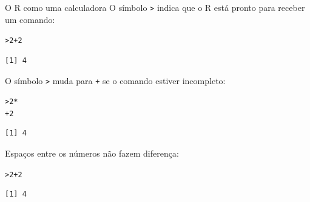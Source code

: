 \documentclass[10pt,handout]{beamer}\usepackage[]{graphicx}\usepackage[]{color}
\makeatletter
\newcommand{\hlnum}[1]{\textcolor[rgb]{0.686,0.059,0.569}{#1}}%
\newcommand{\hlopt}[1]{\textcolor[rgb]{0,0,0}{#1}}%
\newcommand{\hlstd}[1]{\textcolor[rgb]{0.345,0.345,0.345}{#1}}%
\newenvironment{kframe}{%
 \def\at@end@of@kframe{}%
 \ifinner\ifhmode%
  \def\at@end@of@kframe{\end{minipage}}%
  \begin{minipage}{\columnwidth}%
 \fi\fi%
 \def\FrameCommand##1{\hskip\@totalleftmargin \hskip-\fboxsep
 \colorbox{shadecolor}{##1}\hskip-\fboxsep
     \hskip-\linewidth \hskip-\@totalleftmargin \hskip\columnwidth}%
 \MakeFramed {\advance\hsize-\width
   \@totalleftmargin\z@ \linewidth\hsize
   \@setminipage}}%
 {\par\unskip\endMakeFramed%
 \at@end@of@kframe}
\newenvironment{knitrout}{}{} %
\makeatother
\begin{document}
\begin{frame}[fragile]{O R como uma calculadora}
O símbolo \verb|>| indica que o R está pronto para receber um comando:
\begin{knitrout}\small
{}\color{fgcolor}\begin{kframe}
\begin{alltt}
\hlstd{> }\hlnum{2} \hlopt{+} \hlnum{2}
\end{alltt}
\begin{verbatim}
[1] 4
\end{verbatim}
\end{kframe}
\end{knitrout}

O símbolo \verb|>| muda para \verb|+| se o comando estiver incompleto:
\begin{knitrout}\small
{}\color{fgcolor}\begin{kframe}
\begin{alltt}
\hlstd{> }\hlnum{2} \hlopt{*}
\hlstd{+ }\hlnum{2}
\end{alltt}
\begin{verbatim}
[1] 4
\end{verbatim}
\end{kframe}
\end{knitrout}

Espaços entre os números não fazem diferença:
\begin{knitrout}\small
{}\color{fgcolor}\begin{kframe}
\begin{alltt}
\hlstd{> }\hlnum{2}\hlopt{+}         \hlnum{2}
\end{alltt}
\begin{verbatim}
[1] 4
\end{verbatim}
\end{kframe}
\end{knitrout}

\end{frame}
\end{document}
